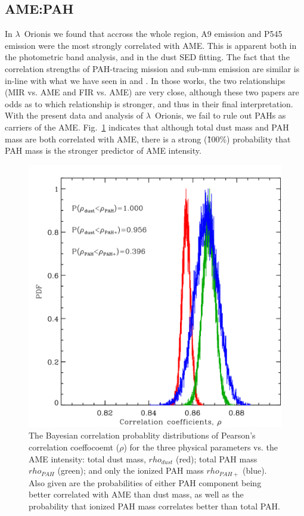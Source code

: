     \subsection{AME:PAH}
      In  $\lambda$~Orionis we found that accross the whole region, A9 emission and P545 emission were the most strongly correlated with AME. This is apparent both in the photometric band analysis, and in the dust SED fitting.  The fact that the correlation strengths of PAH-tracing mission and sub-mm emission are similar is in-line with what we have seen in \cite{ysard10b} and \cite{hensley16}. In those works, the two relationships (MIR vs. AME and FIR vs. AME) are very close, although these two papers are odds as to which relationship is stronger, and thus in their final interpretation. With the present data and analysis of $\lambda$~Orionis, we fail to rule out PAHs as carriers of the AME. Fig.~\ref{fig:fred_LOri_notes_Oct2017_fig2c} indicates that although total dust mass and PAH mass are both correlated with AME, there is a strong (\~100\%) probability that PAH mass is the stronger predictor of AME intensity.
          \begin{figure}
            \includegraphics[width=\textwidth/2]{../Plots/ch_lori/fred_LOri_notes_Oct2017_fig2c.pdf}
            \centering
            \caption{ The Bayesian correlation probablity distributions of Pearson's correlation coeffocoemt ($\rho{}$) for the three physical parameters vs. the AME intensity: total dust mass, $rho_{dust}$ (red); total PAH mass $rho_{PAH}$ (green); and only the ionized PAH mass $rho_{PAH+}$ (blue). Also given are the probabilities of either PAH component being better correlated with AME than dust mass, as well as the probability that ionized PAH mass correlates better than total PAH.}
            \label{fig:fred_LOri_notes_Oct2017_fig2c}
          \end{figure}
